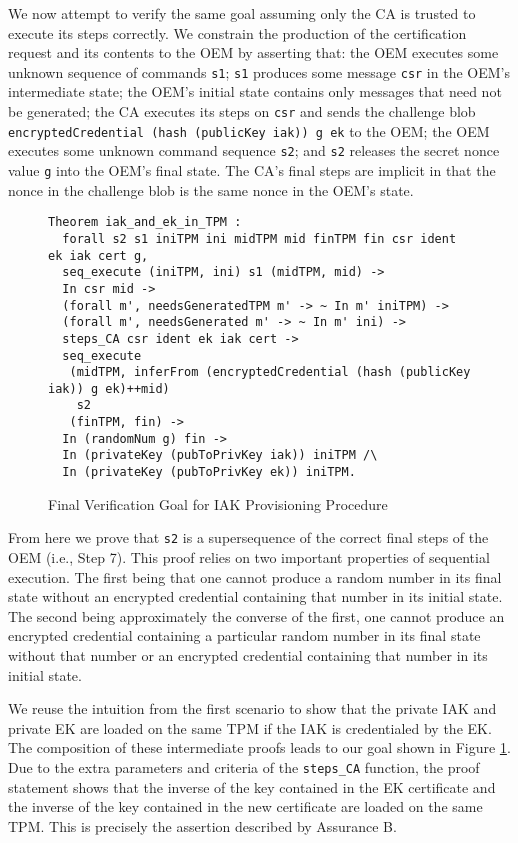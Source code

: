 \documentclass[runningheads]{llncs}
\begin{document}
We now attempt to verify the same goal assuming only the CA is trusted
to execute its steps correctly.  We constrain the production of the
certification request and its contents to the OEM by asserting that:
the OEM executes some unknown sequence of commands \verb|s1|;
\verb|s1| produces some message \verb|csr| in the OEM's intermediate
state; the OEM's initial state contains only messages that need not be
generated; the CA executes its steps on \verb|csr| and sends the
challenge blob \verb|encryptedCredential (hash (publicKey iak)) g ek|
to the OEM; the OEM executes some unknown command sequence \verb|s2|;
and \verb|s2| releases the secret nonce value \verb|g| into the OEM's
final state. The CA's final steps are implicit in that the nonce in
the challenge blob is the same nonce in the OEM's state.

\begin{figure}[hptb]
\begin{lstlisting}[language=Coq]
Theorem iak_and_ek_in_TPM :
  forall s2 s1 iniTPM ini midTPM mid finTPM fin csr ident ek iak cert g,
  seq_execute (iniTPM, ini) s1 (midTPM, mid) -> 
  In csr mid ->
  (forall m', needsGeneratedTPM m' -> ~ In m' iniTPM) ->
  (forall m', needsGenerated m' -> ~ In m' ini) ->
  steps_CA csr ident ek iak cert ->
  seq_execute
   (midTPM, inferFrom (encryptedCredential (hash (publicKey iak)) g ek)++mid)
    s2 
   (finTPM, fin) ->
  In (randomNum g) fin ->
  In (privateKey (pubToPrivKey iak)) iniTPM /\ 
  In (privateKey (pubToPrivKey ek)) iniTPM.
\end{lstlisting}
\caption{Final Verification Goal for IAK Provisioning Procedure}
\label{fig:iak_goal}
\end{figure}

From here we prove that \verb|s2| is a supersequence of the correct
final steps of the OEM (i.e., Step 7). This proof relies on two
important properties of sequential execution. The first being that one
cannot produce a random number in its final state without an encrypted
credential containing that number in its initial state. The second
being approximately the converse of the first, one cannot produce an
encrypted credential containing a particular random number in its
final state without that number or an encrypted credential containing
that number in its initial state.

We reuse the intuition from the first scenario to show that the private
IAK and private EK are loaded on the same TPM if the IAK is
credentialed by the EK.
The composition of these intermediate proofs leads
to our goal shown in Figure \ref{fig:iak_goal}.  Due to the extra
parameters and criteria of the \verb|steps_CA| function, the proof
statement shows that the inverse of the key contained in the EK
certificate and the inverse of the key contained in the new
certificate are loaded on the same TPM. This is precisely the
assertion described by Assurance B.
\end{document}
